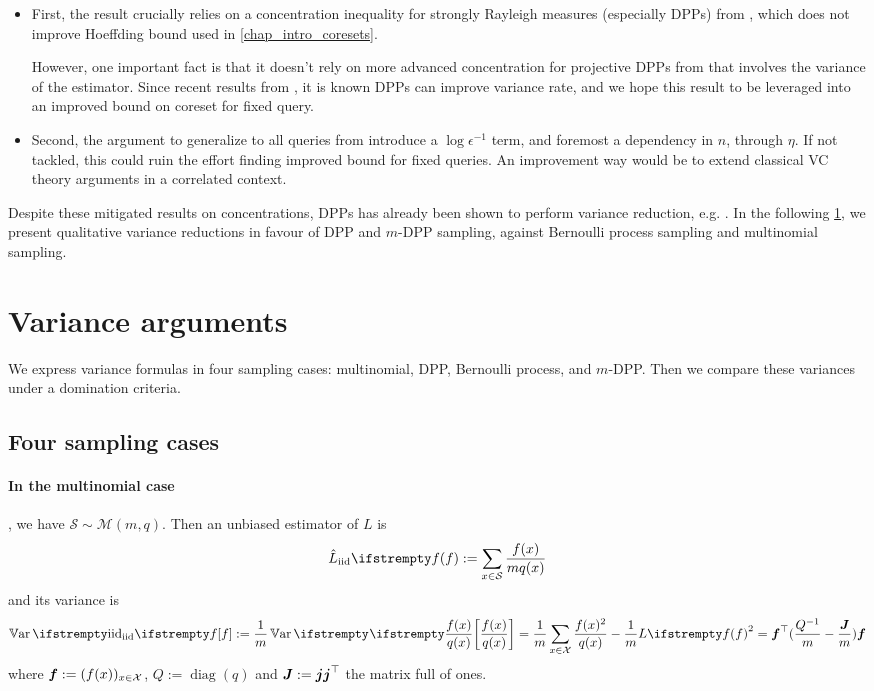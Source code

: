 \begin{itemize}
	\item First, the result crucially relies on a concentration inequality for strongly Rayleigh measures (especially DPPs) from \cite{pemantle2011rayleighconcentration}, which does not improve Hoeffding bound used in \cref{chap_intro_coresets}. 

	However, one important fact is that it doesn't rely on more advanced concentration for projective DPPs from \cite{breuer2013nevai} that involves the variance of the estimator. Since recent results from \cite{bardenet2020mcdpp}, it is known DPPs can improve variance rate, and we hope this result to be leveraged into an improved bound on coreset for fixed query.

	\item Second, the argument to generalize to all queries from \cite{tremblay2018dppcoreset} introduce a $\log \epsilon^{-1}$ term, and foremost a dependency in $n$, through $\eta$. If not tackled, this could ruin the effort finding improved bound for fixed queries. An improvement way would be to extend classical VC theory arguments in a correlated context.
\end{itemize}


Despite these mitigated results on concentrations, DPPs has already been shown to perform variance reduction, e.g. \cite{bardenet2020mcdpp}. In the following \cref{sec__variance_arguments}, we present qualitative variance reductions in favour of DPP and $m$-DPP sampling, against Bernoulli process sampling and multinomial sampling.


\section{Variance arguments}
\label{sec__variance_arguments}
We express variance formulas in four sampling cases: multinomial, DPP, Bernoulli process, and $m$-DPP. Then we compare these variances under a domination criteria.
\subsection{Four sampling cases}
\label{subsec__foursampl}
\paragraph{In the multinomial case}, we have $\mathcal S \sim \mathcal M(m, q)$. Then an unbiased estimator of $L$ is
\begin{equation*}
	\estloss{\textrm{iid}}{\query} := \sum_{x\in \mathcal S} \frac{\query(x)}{m q(x)}
\end{equation*}
and its variance is
\begin{equation*}
	\Var{\textrm{iid}}{\query} :=\frac{1}{m} \Var{}{\frac {\query(x)} {q(x)}}
	=\frac{1}{m} \sum_{x \in \mathcal{X}} \frac{\query(x)^{2}}{q(x)} -\frac{1}{m} \loss{\query}^{2} = \boldsymbol\query\T(\frac{Q^{-1}} m - \frac{\moones} m)\boldsymbol\query
\end{equation*}
where $\boldsymbol{f} := (f(x))_{x\in \mathcal{X}}$, $Q := \operatorname{diag}(q)$ and $\boldsymbol{J} := \boldsymbol{j} \boldsymbol{j} ^\top$ the matrix full of ones. 


